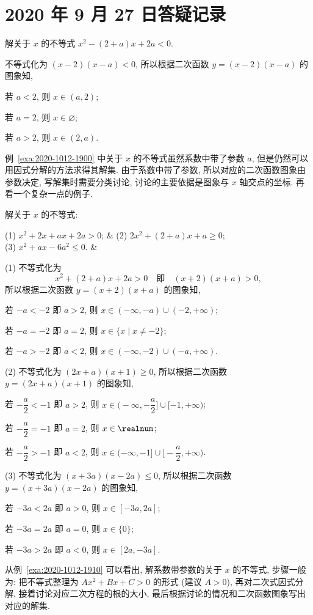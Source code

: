 \section{2020 年 9 月 27 日答疑记录}

\begin{example}\label{exa:2020-1012-1900}
  解关于 $x$ 的不等式 $x^2-(2+a)x+2a<0$.
\end{example}
\begin{solution}
  不等式化为 $(x-2)(x-a)<0$, 所以根据二次函数 $y=(x-2)(x-a)$ 的图象知,
  
  若 $a<2$, 则 $x\in (a,2)$; 
  
  若 $a=2$, 则 $x\in \varnothing$; 
  
  若 $a>2$, 则 $x\in (2,a)$.
\end{solution}

例~\ref{exa:2020-1012-1900} 中关于 $x$ 的不等式虽然系数中带了参数 $a$, 但是仍然可以用因式分解的方法求得其解集. 由于系数中带了参数, 所以对应的二次函数图象由参数决定, 写解集时需要分类讨论, 讨论的主要依据是图象与 $x$ 轴交点的坐标. 再看一个复杂一点的例子.

\begin{example}\label{exa:2020-1012-1910} 
  解关于 $x$ 的不等式:
  \begin{twocolpro}
    (1) $x^2+2x+ax+2a>0$; & (2) $2x^2+(2+a)x+a\geqslant 0$;\\ 
    (3) $x^2+ax-6a^2\leqslant 0$. &
  \end{twocolpro}
\end{example}
\begin{solution}
  (1) 不等式化为 
  \[x^2+(2+a)x+2a>0\quad\text{即}\quad (x+2)(x+a)>0,\]
  所以根据二次函数 $y=(x+2)(x+a)$ 的图象知, 
  
  若 $-a<-2$ 即 $a>2$, 则 $x\in (-\infty,-a)\cup (-2,+\infty)$; 
  
  若 $-a=-2$ 即 $a=2$, 则 $x\in \{x\mid x\neq-2\}$; 
  
  若 $-a>-2$ 即 $a<2$, 则 $x\in (-\infty,-2)\cup (-a,+\infty)$.
  
  (2) 不等式化为 $(2x+a)(x+1)\geqslant 0$, 所以根据二次函数 $y=(2x+a)(x+1)$ 的图象知, 
  
  若 $-\dfrac{a}2<-1$ 即 $a>2$, 则 $x\in \biggl(-\infty,-\dfrac{a}2\biggr]\cup [-1,+\infty)$; 
  
  若 $-\dfrac{a}2=-1$ 即 $a=2$, 则 $x\in \realnum$; 
  
  若 $-\dfrac{a}2>-1$ 即 $a<2$, 则 $x\in (-\infty,-1]\cup \biggl[-\dfrac{a}2,+\infty\biggr)$.
  
  (3) 不等式化为 $(x+3a)(x-2a)\leqslant 0$, 所以根据二次函数 $y=(x+3a)(x-2a)$ 的图象知, 
  
  若 $-3a<2a$ 即 $a>0$, 则 $x\in [-3a,2a]$; 
  
  若 $-3a=2a$ 即 $a=0$, 则 $x\in \{0\}$; 
  
  若 $-3a>2a$ 即 $a<0$, 则 $x\in [2a,-3a]$.
\end{solution}

从例~\ref{exa:2020-1012-1910} 可以看出, 解系数带参数的关于 $x$ 的不等式, 步骤一般为: 把不等式整理为 $Ax^2+Bx+C>0$ 的形式 (建议 $A>0$), 再对二次式因式分解, 接着讨论对应二次方程的根的大小, 最后根据讨论的情况和二次函数图象写出对应的解集. 


